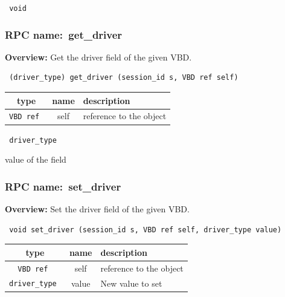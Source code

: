\vspace{0.3cm}

{\tt 
void
}



\vspace{0.3cm}
\vspace{0.3cm}
\vspace{0.3cm}
\subsubsection{RPC name:~get\_driver}

{\bf Overview:} 
Get the driver field of the given VBD.

\begin{verbatim} (driver_type) get_driver (session_id s, VBD ref self)\end{verbatim}



 
\vspace{0.3cm}
\begin{tabular}{|c|c|p{7cm}|}
 \hline
{\bf type} & {\bf name} & {\bf description} \\ \hline
{\tt VBD ref } & self & reference to the object \\ \hline 

\end{tabular}

\vspace{0.3cm}

{\tt 
driver\_type
}


value of the field
\vspace{0.3cm}
\vspace{0.3cm}
\vspace{0.3cm}
\subsubsection{RPC name:~set\_driver}

{\bf Overview:} 
Set the driver field of the given VBD.

\begin{verbatim} void set_driver (session_id s, VBD ref self, driver_type value)\end{verbatim}



 
\vspace{0.3cm}
\begin{tabular}{|c|c|p{7cm}|}
 \hline
{\bf type} & {\bf name} & {\bf description} \\ \hline
{\tt VBD ref } & self & reference to the object \\ \hline 

{\tt driver\_type } & value & New value to set \\ \hline 

\end{tabular}


